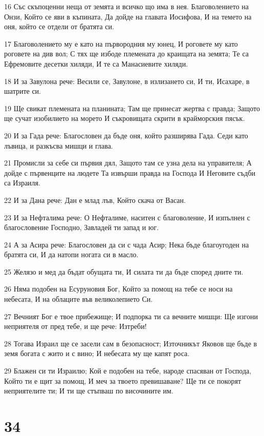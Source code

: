 \par 16 Със скъпоценни неща от земята и всичко що има в нея. Благоволението на Онзи, Който се яви в къпината, Да дойде на главата Иосифова, И на темето на оня, който се отдели от братята си.
\par 17 Благоволението му е като на първородния му юнец, И роговете му като роговете на див вол; С тях ще избоде племената до краищата на земята; Те са Ефремовите десетки хиляди, И те са Манасиевите хиляди.
\par 18 И за Завулона рече: Весили се, Завулоне, в излизането си, И ти, Исахаре, в шатрите си.
\par 19 Ще свикат племената на планината; Там ще принесат жертва с правда; Защото ще сучат изобилието на морето И съкровищата скрити в крайморския пясък.
\par 20 И за Гада рече: Благословен да бъде оня, който разширява Гада. Седи като лъвица, и разкъсва мишци и глава.
\par 21 Промисли за себе си първия дял, Защото там се узна дела на управителя; А дойде с първенците на людете Та извърши правда на Господа И Неговите съдби са Израиля.
\par 22 И за Дана рече: Дан е млад лъв, Който скача от Васан.
\par 23 И за Нефталима рече: О Нефталиме, наситен с благоволение, И изпълнен с благословение Господно, Завладей ти запад и юг.
\par 24 А за Асира рече: Благословен да си с чада Асир; Нека бъде благоугоден на братята си, И да натопи ногата си в масло.
\par 25 Желязо и мед да бъдат обущата ти, И силата ти да бъде според дните ти.
\par 26 Няма подобен на Есуруновия Бог, Който за помощ на тебе се носи на небесата, И на облаците във великолепието Си.
\par 27 Вечният Бог е твое прибежище; И подпорка ти са вечните мишци: Ще изгони неприятеля от пред тебе, и ще рече: Изтреби!
\par 28 Тогава Израил ще се засели сам в безопасност; Източникът Яковов ще бъде в земя богата с жито и с вино; И небесата му ще капят роса.
\par 29 Блажен си ти Израилю; Кой е подобен на тебе, народе спасяван от Господа, Който ти е щит за помощ, И меч за твоето превишаване? Ще ти се покорят неприятелите ти; И ти ще стъпваш по височините им.

\chapter{34}

